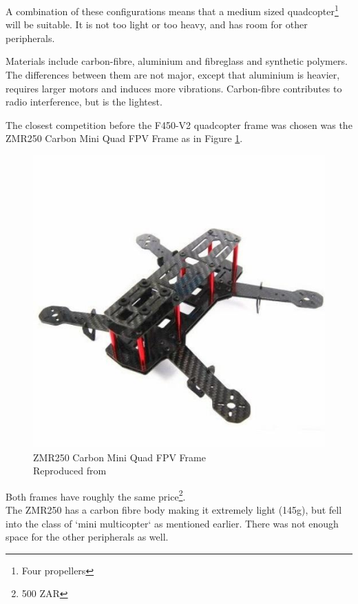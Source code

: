 A combination of these configurations means that a medium sized quadcopter\footnote{Four propellers} will be suitable. It is not too light or too heavy, and has room for other peripherals.

Materials include carbon-fibre, aluminium and fibreglass and synthetic polymers. The differences between them are not major, except that aluminium is heavier, requires larger motors and induces more vibrations. Carbon-fibre contributes to radio interference\cite{frame}, but is the lightest.

The closest competition before the F450-V2 quadcopter frame was chosen was the ZMR250 Carbon Mini Quad FPV Frame as in Figure \ref{fig:zmr}.

\begin{figure}[H]
\centering
\includegraphics[scale=0.35]{images/zmr250.jpeg}
\caption{ZMR250 Carbon Mini Quad FPV Frame\\
Reproduced from \cite{frobot}}
\label{fig:zmr}
\end{figure}

Both frames have roughly the same price\footnote{500 ZAR}.\\

The ZMR250 has a carbon fibre body making it extremely light (145g), but fell into the class of `mini multicopter` as mentioned earlier. There was not enough space for the other peripherals as well.\\

